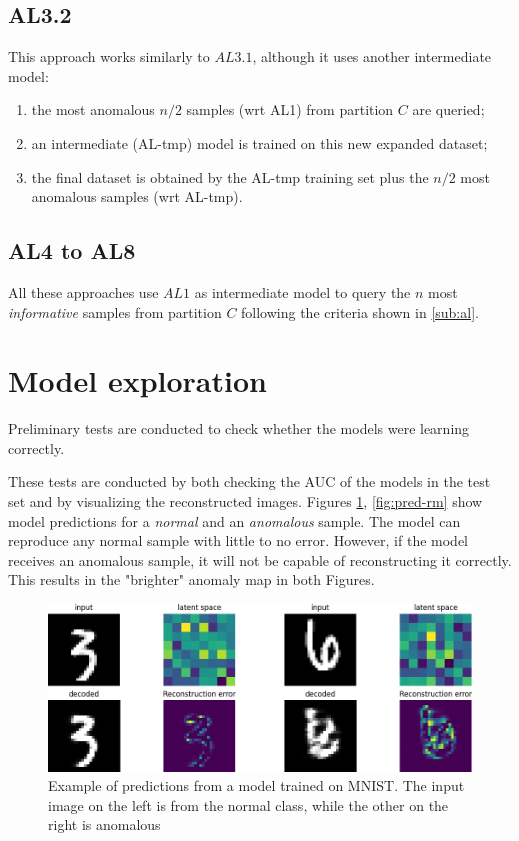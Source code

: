              \subsection*{AL3.2}
             This approach works similarly to $AL3.1$, although it uses another intermediate model:
                \begin{enumerate}
                    \item the most anomalous $n/2$ samples (wrt AL1) from partition $C$ are queried;
                    \item an intermediate (AL-tmp) model is trained on this new expanded dataset;
                    \item the final dataset is obtained by the AL-tmp training set plus the $n/2$ most anomalous samples (wrt AL-tmp).
                \end{enumerate}
                
             \subsection*{AL4 to AL8}
             All these approaches use $AL1$ as intermediate model to query the $n$ most \emph{informative} samples from partition $C$ following the criteria shown in \autoref{sub:al}.

    \section{Model exploration}

        Preliminary tests are conducted to check whether the models were learning correctly.
        
        
        These tests are conducted by both checking the AUC of the models in the test set and by visualizing the reconstructed images. Figures \ref{fig:pred-mnist}, \ref{fig:pred-rm} show model predictions for a \emph{normal} and an \emph{anomalous} sample. The model can reproduce any normal sample with little to no error. However, if the model receives an anomalous sample, it will not be capable of reconstructing it correctly. This results in the "brighter" anomaly map in both Figures.
        
        \begin{figure}[H]
                \centering
                \centerline{\includegraphics[width=\textwidth]{img/prediction_MNIST.png}}
                \caption{Example of predictions from a model trained on MNIST. The input image on the left is from the normal class, while the other on the right is anomalous}
                \label{fig:pred-mnist}
        \end{figure}
        
